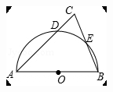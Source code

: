\documentclass[12pt]{article}
\begin{document}
\begin{center}
\begin{minipage}{0.32\textwidth}
\includegraphics[width=0.95\linewidth]{out_rommath_origin/items/geo485-origin/assets/figure_circle.png}
\end{minipage}
\par
\end{center}
\bigskip
\end{document}
